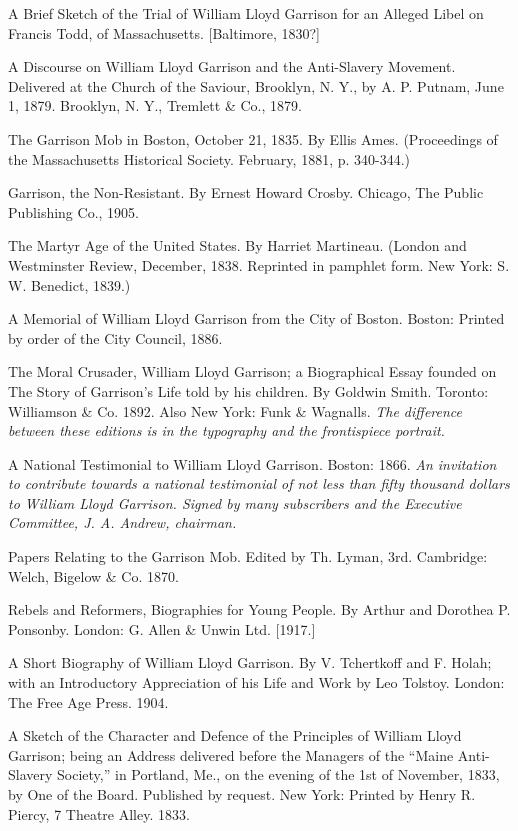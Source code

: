 \documentclass{book}
\begin{document}
A Brief Sketch of the Trial of William Lloyd Garrison for an Alleged Libel on Francis Todd, of Massachusetts. {[}Baltimore, 1830?{]}

A Discourse on William Lloyd Garrison and the Anti-Slavery Movement. Delivered at the Church of the Saviour, Brooklyn, N. Y., by A. P. Putnam, June 1, 1879. Brooklyn, N. Y., Tremlett \& Co., 1879.

The Garrison Mob in Boston, October 21, 1835. By Ellis Ames. (Proceedings of the Massachusetts Historical Society. February, 1881, p. 340-344.)

Garrison, the Non-Resistant. By Ernest Howard Crosby. Chicago, The Public Publishing Co., 1905.

The Martyr Age of the United States. By Harriet Martineau. (London and Westminster Review, December, 1838. Reprinted in pamphlet form. New York: S. W. Benedict, 1839.)

A Memorial of William Lloyd Garrison from the City of Boston. Boston: Printed by order of the City Council, 1886.

The Moral Crusader, William Lloyd Garrison; a Biographical Essay founded on The Story of Garrison’s Life told by his children. By Goldwin Smith. Toronto: Williamson \& Co. 1892. Also New York: Funk \& Wagnalls. \emph{The difference between these editions is in the typography and the frontispiece portrait.}

A National Testimonial to William Lloyd Garrison. Boston: 1866. \emph{An invitation to contribute towards a national testimonial of not less than fifty thousand dollars to William Lloyd Garrison. Signed by many subscribers and the Executive Committee, J. A. Andrew, chairman.}

Papers Relating to the Garrison Mob. Edited by Th. Lyman, 3rd. Cambridge: Welch, Bigelow \& Co. 1870.

Rebels and Reformers, Biographies for Young People. By Arthur and Dorothea P. Ponsonby. London: G. Allen \& Unwin Ltd. {[}1917.{]}

A Short Biography of William Lloyd Garrison. By V. Tchertkoff and F. Holah; with an Introductory Appreciation of his Life and Work by Leo Tolstoy. London: The Free Age Press. 1904.

A Sketch of the Character and Defence of the Principles of William Lloyd Garrison; being an Address delivered before the Managers of the “Maine Anti-Slavery Society,” in Portland, Me., on the evening of the 1st of November, 1833, by One of the Board. Published by request. New York: Printed by Henry R. Piercy, 7 Theatre Alley. 1833.
\end{document}
